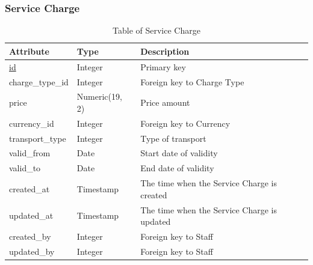 \subsubsection{Service Charge}
\begin{table}[H]
    \centering
    \begin{tabular}{|p{3cm}|p{3cm}|p{\dimexpr\textwidth-7.8cm}|} %
        \hline
        \rowcolor[HTML]{C0C0C0} 
        \textbf{Attribute} & \textbf{Type} & \textbf{Description} \\ \hline
        \underline{id} & Integer & Primary key \\ \hline
        charge\_type\_id & Integer & Foreign key to Charge Type \\ \hline
        price & Numeric(19, 2) & Price amount \\ \hline
        currency\_id & Integer & Foreign key to Currency \\ \hline
        transport\_type & Integer & Type of transport \\ \hline
        valid\_from & Date & Start date of validity \\ \hline
        valid\_to & Date & End date of validity \\ \hline
        created\_at & Timestamp & The time when the Service Charge is created \\ \hline
        updated\_at & Timestamp & The time when the Service Charge is updated \\ \hline
        created\_by & Integer & Foreign key to Staff \\ \hline
        updated\_by & Integer & Foreign key to Staff \\ \hline
    \end{tabular}
    \caption{Table of Service Charge}
    \label{tab:service-charge-table}
\end{table}

